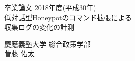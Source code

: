 \begin{titlepage}
  \begin{center}
    \begin{large}
      卒業論文   2018年度(平成30年)\\
      \vspace{24pt}
      低対話型Honeypotのコマンド拡張による\\収集ログの変化の計測
      \end{large}
  \end{center}
  \vspace{40em}
  \begin{flushright}
    \large 慶應義塾大学 総合政策学部\\
    菅藤 佑太
  \end{flushright}
\end{titlepage}
